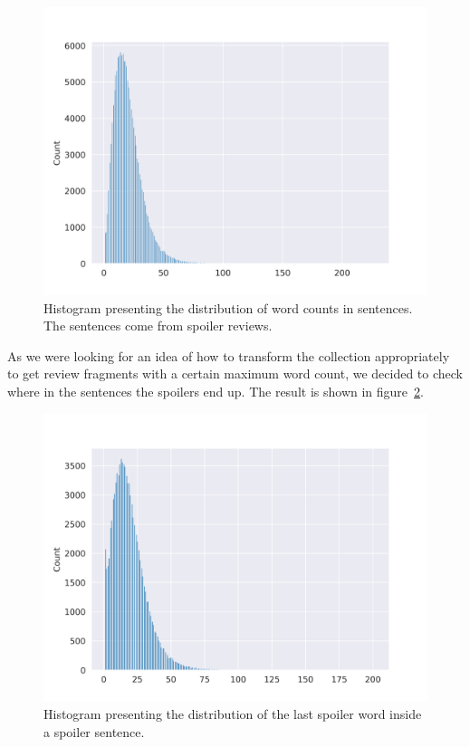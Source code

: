 \documentclass[11pt]{article}
\begin{document}
\begin{figure}
    \centering
    \includegraphics[width=\columnwidth]{img/eda/word_count_per_sencence_in_spoiler_review.png}
    \caption{Histogram presenting the distribution of word counts in sentences. The sentences come from spoiler reviews.} 
    \label{fig:word_count_per_sentence_in_spoiler_review}
\end{figure}

As we were looking for an idea of how to transform the collection appropriately to get review fragments with a certain maximum word count, we decided to check where in the sentences the spoilers end up. The result is shown in figure~\ref{fig:on_which_word_in_sentence_spoiler_ends}.
\begin{figure}
    \centering
    \includegraphics[width=\columnwidth]{img/eda/on_which_word_in_sentence_spoiler_ends.png}
    \caption{Histogram presenting the distribution of the last spoiler word inside a spoiler sentence.} 
    \label{fig:on_which_word_in_sentence_spoiler_ends}
\end{figure}
\end{document}
